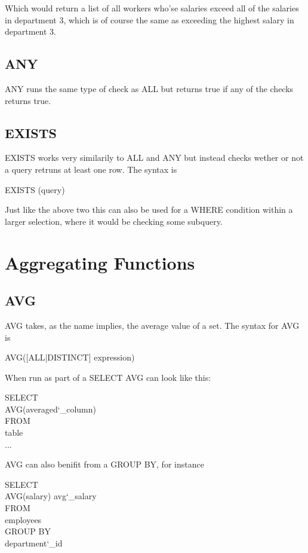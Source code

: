 \documentclass[10pt, english]{article}
\begin{document}
Which would return a list of all workers who'se salaries exceed all of the salaries in department 3, which is of course
the same as exceeding the highest salary in department 3.

\subsection{ANY}
ANY runs the same type of check as ALL but returns true if any of the checks returns true.

\subsection{EXISTS}
EXISTS works very similarily to ALL and ANY but instead checks wether or not a query retruns at least one row. The syntax is 

\begin{texttt}EXISTS (query)\end{texttt}

Just like the above two this can also be used for a WHERE condition within a larger selection, where it would be checking some subquery.

\newpage
\section{Aggregating Functions}
\subsection{AVG}
AVG takes, as the name implies, the average value of a set. The syntax for AVG is 

\begin{texttt}AVG([ALL|DISTINCT] expression)\end{texttt}

When run as part of a SELECT AVG can look like this:

\begin{texttt}
SELECT \\
\hspace*{10pt} AVG(averaged\char`_column) \\
FROM \\
\hspace*{10pt} table \\
...
\end{texttt}

AVG can also benifit from a GROUP BY, for instance

\begin{texttt}
SELECT \\
\hspace*{10pt} AVG(salary) avg\char`_salary \\
FROM \\
\hspace*{10pt} employees \\
GROUP BY \\
\hspace*{10pt} department\char`_id\\
\end{texttt}
\end{document}
